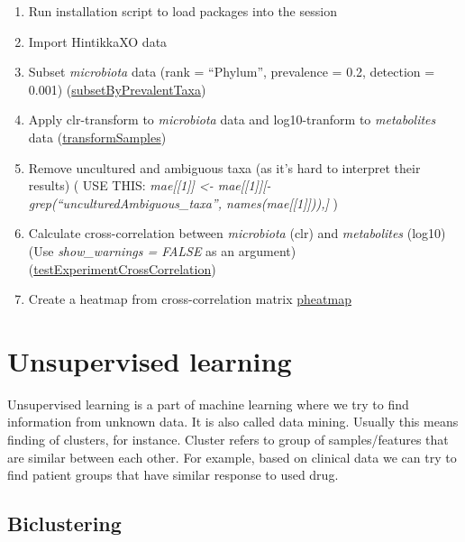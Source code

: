 \documentclass[
  oneside]{book}
\begin{document}
\begin{enumerate}
\def\labelenumi{\arabic{enumi}.}
\item
  Run installation script to load packages into the session
\item
  Import HintikkaXO data
\item
  Subset \emph{microbiota} data (rank = ``Phylum'', prevalence = 0.2, detection = 0.001) (\href{https://microbiome.github.io/OMA/differential-abundance.html\#prevalence-filtering}{subsetByPrevalentTaxa})
\item
  Apply clr-transform to \emph{microbiota} data and log10-tranform to \emph{metabolites} data (\href{https://microbiome.github.io/OMA/taxonomic-information.html\#data-transformation}{transformSamples})
\item
  Remove uncultured and ambiguous taxa (as it's hard to interpret their results) ( USE THIS: \emph{mae{[}{[}1{]}{]} \textless- mae{[}{[}1{]}{]}{[}-grep(``uncultured\textbar Ambiguous\_taxa'', names(mae{[}{[}1{]}{]})),{]}} )
\item
  Calculate cross-correlation between \emph{microbiota} (clr) and \emph{metabolites} (log10) (Use \emph{show\_warnings = FALSE} as an argument)
  (\href{https://microbiome.github.io/OMA/multi-assay_analyses.html\#multi-assay_analyses}{testExperimentCrossCorrelation})
\item
  Create a heatmap from cross-correlation matrix \href{https://microbiome.github.io/OMA/microbiome-community.html\#composition-heatmap}{pheatmap}
\end{enumerate}

\hypertarget{unsupervised-learning}{%
\section{Unsupervised learning}\label{unsupervised-learning}}

Unsupervised learning is a part of machine learning where we try to find information
from unknown data. It is also called data mining. Usually this means finding of
clusters, for instance. Cluster refers to group of samples/features that are similar
between each other. For example, based on clinical data we can try to find patient
groups that have similar response to used drug.

\hypertarget{biclustering}{%
\subsection{Biclustering}\label{biclustering}}
\end{document}
